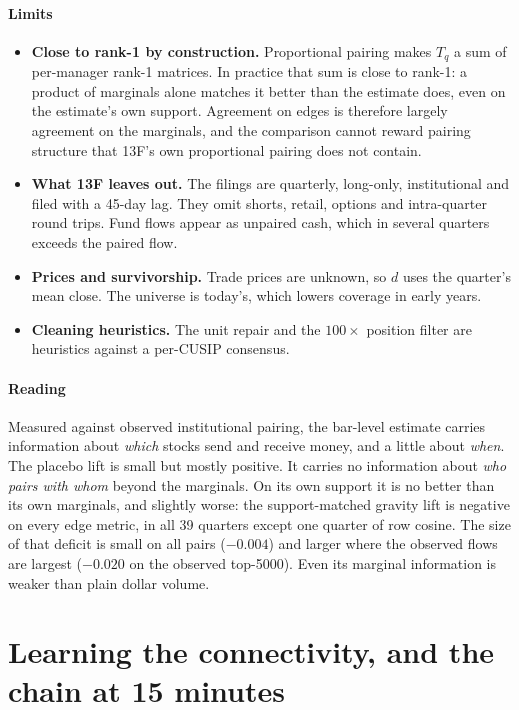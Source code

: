 \documentclass[preprint,3p,twocolumn]{elsarticle}
\begin{document}
\paragraph{Limits}
\begin{itemize}
\item \textbf{Close to rank-1 by construction.} Proportional pairing makes $T_q$ a sum of per-manager rank-1 matrices. In practice that sum is close to rank-1: a product of marginals alone matches it better than the estimate does, even on the estimate's own support. Agreement on edges is therefore largely agreement on the marginals, and the comparison cannot reward pairing structure that 13F's own proportional pairing does not contain.
\item \textbf{What 13F leaves out.} The filings are quarterly, long-only, institutional and filed with a 45-day lag. They omit shorts, retail, options and intra-quarter round trips. Fund flows appear as unpaired cash, which in several quarters exceeds the paired flow.
\item \textbf{Prices and survivorship.} Trade prices are unknown, so $d$ uses the quarter's mean close. The universe is today's, which lowers coverage in early years.
\item \textbf{Cleaning heuristics.} The unit repair and the $100\times$ position filter are heuristics against a per-CUSIP consensus.
\end{itemize}

\paragraph{Reading} Measured against observed institutional pairing, the bar-level estimate carries information about \emph{which} stocks send and receive money, and a little about \emph{when}. The placebo lift is small but mostly positive. It carries no information about \emph{who pairs with whom} beyond the marginals. On its own support it is no better than its own marginals, and slightly worse: the support-matched gravity lift is negative on every edge metric, in all 39 quarters except one quarter of row cosine. The size of that deficit is small on all pairs ($-0.004$) and larger where the observed flows are largest ($-0.020$ on the observed top-5000). Even its marginal information is weaker than plain dollar volume.

\section{Learning the connectivity, and the chain at 15 minutes}
\label{Section:learned}
\end{document}
